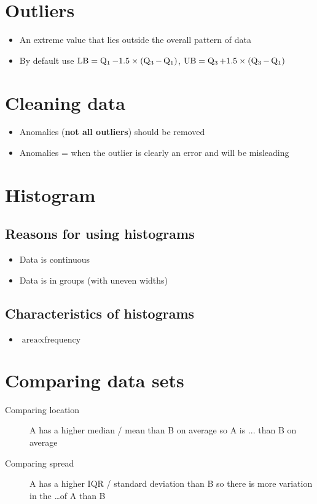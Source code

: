 \section{Outliers}
\begin{itemize}
    \item An extreme value that lies outside the overall pattern of data
    \item By default use $\text{LB} = \operatorname{Q_1} - 1.5\times(\operatorname{Q_3}-\operatorname{Q_1})$, $\text{UB} = \operatorname{Q_3} + 1.5\times(\operatorname{Q_3}-\operatorname{Q_1})$
\end{itemize}

\section{Cleaning data}
\begin{itemize}
    \item Anomalies (\textbf{not all outliers}) should be removed
    \item Anomalies = when the outlier is clearly an error and will be misleading
\end{itemize}


\section{Histogram}
\subsection{Reasons for using histograms}
\begin{itemize}
    \item Data is continuous
    \item Data is in groups (with uneven widths)
\end{itemize}
\subsection{Characteristics of histograms}
\begin{itemize}
    \item $\text{area}\propto\text{frequency}$
\end{itemize}

\section{Comparing data sets}
\begin{description}
    \item[Comparing location] A has a higher median / mean than B on average so A is ... than B on average
    \item[Comparing spread] A has a higher IQR / standard deviation than B so there is more variation in the \dots of A than B
\end{description}